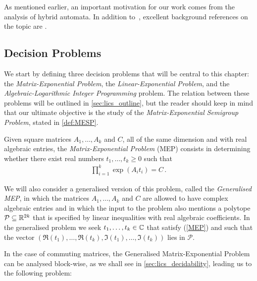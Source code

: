 As mentioned earlier, an important motivation for our work comes from
the analysis of hybrid automata. In addition to~\cite{Alu15},
excellent background references on the topic are
\cite{HenzingerSTOC,HenzingerLICS}.

\subsection{Decision Problems}

We start by defining three decision problems that will be central to this chapter: the \emph{Matrix-Exponential Problem},
the \emph{Linear-Exponential Problem}, and the
\emph{Algebraic-Logarithmic Integer Programming} problem.
The relation between these problems will be outlined in \cref{sec:lics_outline}, but the reader should keep in mind that our ultimate objective is the study of the \emph{Matrix-Exponential Semigroup Problem}, stated in \cref{def:MESP}.

\begin{definition}
  Given square matrices $A_{1}, \ldots, A_{k}$ and $C$, all of the same
  dimension and with real algebraic entries,
  the \emph{Matrix-Exponential Problem} (MEP) consists in determining
  whether there exist real numbers $t_1,\ldots,t_k \geq 0$ such that
\begin{align}
\label{MEP}
\prod \limits_{i=1}^{k} \exp(A_{i} t_{i}) = C \, .
\end{align}
\label{def:MEP}
\end{definition}

We will also consider a generalised version of this problem, called
the \emph{Generalised MEP}, in which the matrices $A_1,\ldots,A_k$ and
$C$ are allowed to have complex algebraic entries and in which the
input to the problem also mentions a polytope
$\mathcal{P}\subseteq\mathbb{R}^{2k}$ that is specified by linear
inequalities with real algebraic coefficients.  In the generalised problem
we seek $t_1,\ldots,t_k \in \mathbb{C}$ that satisfy (\ref{MEP}) and
such that the vector
$(\Re(t_1),\ldots,\Re(t_k),
\Im(t_1),\ldots,\Im(t_k))$ lies in $\mathcal{P}$.

In the case of commuting matrices, the Generalised Matrix-Exponential
Problem can be analysed block-wise, as we shall see in \cref{sec:lics_decidability}, leading us to the following
problem:

